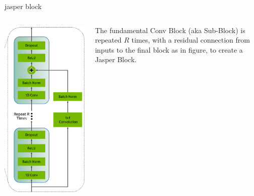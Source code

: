 \documentclass[aspectratio=169,xcolor={dvipsnames,svgnames}]{beamer}
\begin{document}
\begin{frame}[label={sec:orga5b98e6}]{jasper block}
\begin{columns}
\begin{column}{0.25\columnwidth}
\begin{center}
\includegraphics[width=.9\linewidth]{org-download-images/Contribution/2024-09-16_23-01-42_screenshot.png}
\end{center}
\end{column}
\begin{column}{0.6\columnwidth}
The fundamental Conv Block (aka Sub-Block) is repeated
\(R\) times, with a residual connection from inputs to
the final block as in figure, to create a Jasper Block.
\end{column}
\end{columns}
\end{frame}
\end{document}
